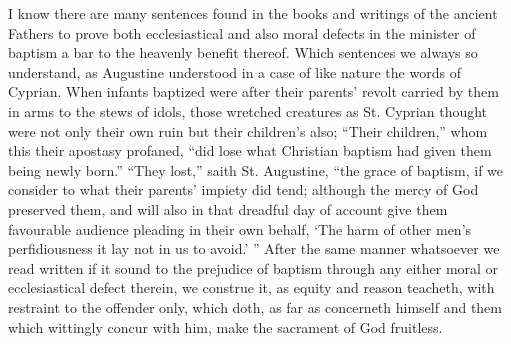 I know there are many sentences found in the books and writings of the ancient Fathers to prove both ecclesiastical and also moral defects in the minister of baptism a bar to the heavenly benefit thereof. Which sentences we always so understand, as Augustine understood in a case of like nature the words of Cyprian. When infants baptized were after their parents’ revolt carried by them in arms to the stews of idols, those wretched creatures as St. Cyprian thought were not only their own ruin but their children’s also; “Their children,” whom this their apostasy profaned, “did lose what Christian baptism had given them being newly born.” “They lost,” saith St. Augustine, “the grace of baptism, if we consider to what their parents’ impiety did tend; although the mercy of God preserved them, and will also in that dreadful day of account give them favourable audience pleading in their own behalf, ‘The harm of other men’s perfidiousness it lay not in us to avoid.’ ” After the same manner whatsoever we  read written if it sound to the prejudice of baptism through any either moral or ecclesiastical defect therein, we construe it, as equity and reason teacheth, with restraint to the offender only, which doth, as far as concerneth himself and them which wittingly concur with him, make the sacrament of God fruitless.
